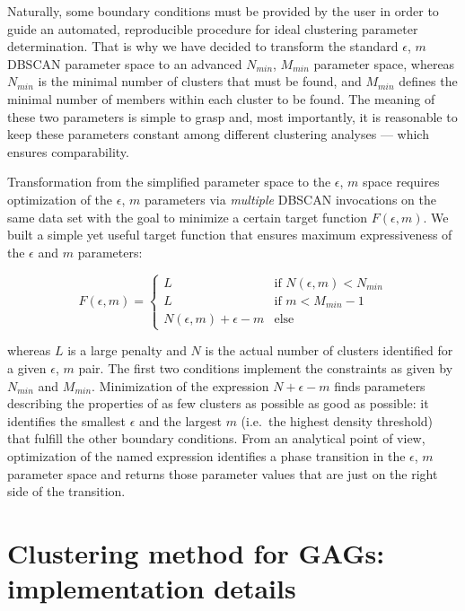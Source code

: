 Naturally, some boundary conditions must be provided by the user in order to
guide an automated, reproducible procedure for ideal clustering parameter
determination. That is why we have decided to transform the standard $\epsilon$,
$m$ DBSCAN parameter space to an advanced $N_{min}$, $M_{min}$ parameter space,
whereas $N_{min}$ is the minimal number of clusters that must be found, and
$M_{min}$ defines the minimal number of members within each cluster to be found.
The meaning of these two parameters is simple to grasp and, most importantly, it
is reasonable to keep these parameters constant among different clustering
analyses --- which ensures comparability.

Transformation from the simplified parameter space to the $\epsilon$, $m$ space
requires optimization of the $\epsilon$, $m$ parameters via \textit{multiple}
DBSCAN invocations on the same data set with the goal to minimize a certain
target function $F(\epsilon, m)$. We built a simple yet useful target function
that ensures maximum expressiveness of the $\epsilon$ and $m$ parameters:

\begin{equation}
F(\epsilon, m) =
\begin{cases}
L & \text{if } N(\epsilon, m) < N_{min} \\
L & \text{if } m < M_{min}-1 \\
N(\epsilon, m) + \epsilon - m & \text{else}
\end{cases}
\end{equation}

whereas $L$ is a large penalty and $N$ is the actual number of clusters
identified for a given $\epsilon$, $m$ pair. The first two conditions implement
the constraints as given by $N_{min}$ and $M_{min}$. Minimization of the
expression $N + \epsilon - m$ finds parameters describing the properties of as
few clusters as possible as good as possible: it identifies the smallest
$\epsilon$ and the largest $m$ (i.e.\ the highest density threshold) that
fulfill the other boundary conditions. From an analytical point of view,
optimization of the named expression identifies a phase transition in the
$\epsilon$, $m$ parameter space and returns those parameter values that are just
on the right side of the transition.


\section{Clustering method for GAGs: implementation details}


